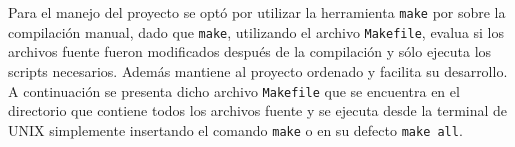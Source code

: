 
Para el manejo del proyecto se optó por utilizar la herramienta \texttt{make} por sobre la compilación manual, dado que \texttt{make}, utilizando el archivo \texttt{Makefile}, evalua si los archivos fuente fueron modificados después de la compilación y sólo ejecuta los scripts necesarios. Además mantiene al proyecto ordenado y facilita su desarrollo. A continuación se presenta dicho archivo \texttt{Makefile} que se encuentra en el directorio que contiene todos los archivos fuente y se ejecuta desde la terminal de UNIX simplemente insertando el comando \texttt{make} o en su defecto \texttt{make all}. 




